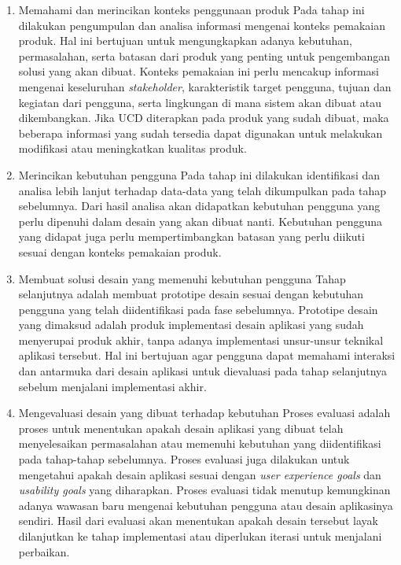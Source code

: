 \begin{enumerate}
  \item Memahami dan merincikan konteks penggunaan produk
  \subitem Pada tahap ini dilakukan pengumpulan dan analisa informasi mengenai konteks pemakaian produk. Hal ini bertujuan untuk mengungkapkan adanya kebutuhan, permasalahan, serta batasan dari produk yang penting untuk pengembangan solusi yang akan dibuat. Konteks pemakaian ini perlu mencakup informasi mengenai keseluruhan \textit{stakeholder}, karakteristik target pengguna, tujuan dan kegiatan dari pengguna, serta lingkungan di mana sistem akan dibuat atau dikembangkan. Jika UCD diterapkan pada produk yang sudah dibuat, maka beberapa informasi yang sudah tersedia dapat digunakan untuk melakukan modifikasi atau meningkatkan kualitas produk.
   
  \item Merincikan kebutuhan pengguna
  \subitem Pada tahap ini dilakukan identifikasi dan analisa lebih lanjut terhadap data-data yang telah dikumpulkan pada tahap sebelumnya. Dari hasil analisa akan didapatkan kebutuhan pengguna yang perlu dipenuhi dalam desain yang akan dibuat nanti. Kebutuhan pengguna yang didapat juga perlu mempertimbangkan batasan yang perlu diikuti sesuai dengan konteks pemakaian produk.
  
  \item Membuat solusi desain yang memenuhi kebutuhan pengguna
  \subitem Tahap selanjutnya adalah membuat prototipe desain sesuai dengan kebutuhan pengguna yang telah diidentifikasi pada fase sebelumnya. Prototipe desain yang dimaksud adalah produk implementasi desain aplikasi yang sudah menyerupai produk akhir, tanpa adanya implementasi unsur-unsur teknikal aplikasi tersebut. Hal ini bertujuan agar pengguna dapat memahami interaksi dan antarmuka dari desain aplikasi untuk dievaluasi pada tahap selanjutnya sebelum menjalani implementasi akhir.
  
  \item Mengevaluasi desain yang dibuat terhadap kebutuhan
  \subitem Proses evaluasi adalah proses untuk menentukan apakah desain aplikasi yang dibuat telah menyelesaikan permasalahan atau memenuhi kebutuhan yang diidentifikasi pada tahap-tahap sebelumnya. Proses evaluasi juga dilakukan untuk mengetahui apakah desain aplikasi sesuai dengan \textit{user experience goals} dan \textit{usability goals} yang diharapkan. Proses evaluasi tidak menutup kemungkinan adanya wawasan baru mengenai kebutuhan pengguna atau desain aplikasinya sendiri. Hasil dari evaluasi akan menentukan apakah desain tersebut layak dilanjutkan ke tahap implementasi atau diperlukan iterasi untuk menjalani perbaikan.

\end{enumerate}



